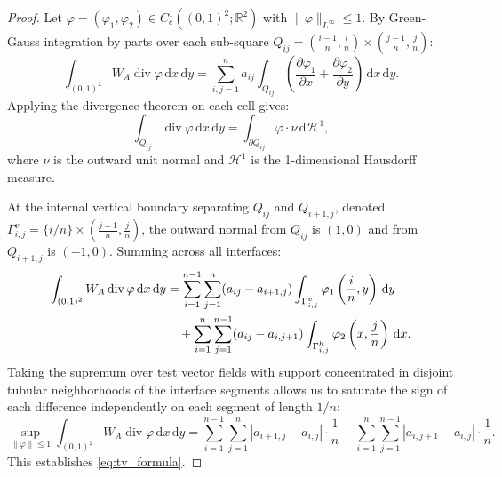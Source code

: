 \documentclass[11pt,a4paper,reqno]{amsart}
\theoremstyle{definition}
\numberwithin{equation}{section}
\providecommand{\R}{\mathbb{R}}
\newcommand{\dif}{\,\mathrm{d}}
\providecommand{\R}{\mathbb{R}}
\begin{document}
\begin{proof}
Let $\varphi = (\varphi_1, \varphi_2) \in C_c^1((0,1)^2; \R^2)$ with $\|\varphi\|_{L^\infty} \le 1$. By Green-Gauss integration by parts over each sub-square $Q_{ij} = (\frac{i-1}{n}, \frac{i}{n}) \times (\frac{j-1}{n}, \frac{j}{n})$:
\begin{equation}
    \int_{(0,1)^2} W_A \operatorname{div} \varphi \dif x \dif y = \sum_{i,j=1}^n a_{ij} \int_{Q_{ij}} \left( \frac{\partial \varphi_1}{\partial x} + \frac{\partial \varphi_2}{\partial y} \right) \dif x \dif y.
\end{equation}
Applying the divergence theorem on each cell gives:
\begin{equation}
    \int_{Q_{ij}} \operatorname{div}\varphi \dif x \dif y = \int_{\partial Q_{ij}} \varphi \cdot \nu \dif \mathcal{H}^1,
\end{equation}
where $\nu$ is the outward unit normal and $\mathcal{H}^1$ is the 1-dimensional Hausdorff measure. 

At the internal vertical boundary separating $Q_{ij}$ and $Q_{i+1, j}$, denoted $\Gamma_{i, j}^v = \{i/n\} \times (\frac{j-1}{n}, \frac{j}{n})$, the outward normal from $Q_{ij}$ is $(1, 0)$ and from $Q_{i+1, j}$ is $(-1, 0)$. Summing across all interfaces:
\begin{align}
    \int_{(0,1)^2} W_A \operatorname{div} \varphi \dif x \dif y 
    &= \sum_{i=1}^{n-1} \sum_{j=1}^n (a_{ij} - a_{i+1, j}) \int_{\Gamma_{i,j}^v} \varphi_1\left(\frac{i}{n}, y\right) \dif y \notag \\
    &\quad + \sum_{i=1}^n \sum_{j=1}^{n-1} (a_{ij} - a_{i, j+1}) \int_{\Gamma_{i,j}^h} \varphi_2\left(x, \frac{j}{n}\right) \dif x.
\end{align}
Taking the supremum over test vector fields with support concentrated in disjoint tubular neighborhoods of the interface segments allows us to saturate the sign of each difference independently on each segment of length $1/n$:
\begin{equation}
    \sup_{\|\varphi\|\le 1} \int_{(0,1)^2} W_A \operatorname{div} \varphi \dif x \dif y = \sum_{i=1}^{n-1} \sum_{j=1}^n |a_{i+1, j} - a_{i,j}| \cdot \frac{1}{n} + \sum_{i=1}^n \sum_{j=1}^{n-1} |a_{i, j+1} - a_{i, j}| \cdot \frac{1}{n}.
\end{equation}
This establishes \eqref{eq:tv_formula}.
\end{proof}
\end{document}
